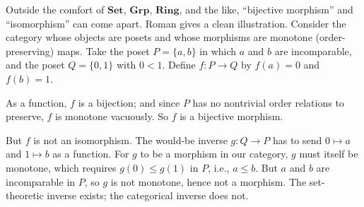 \begin{example}
Outside the comfort of $\mathbf{Set}$, $\mathbf{Grp}$, $\mathbf{Ring}$, and the
like, ``bijective morphism'' and ``isomorphism'' can come apart. Roman
\cite{roman2017introduction} gives a clean illustration. Consider the category
whose objects are posets and whose morphisms are monotone (order-preserving)
maps. Take the poset $P = \{a, b\}$ in which $a$ and $b$ are incomparable, and
the poset $Q = \{0, 1\}$ with $0 < 1$. Define $f : P \to Q$ by $f(a) = 0$ and
$f(b) = 1$.

\begin{center}
\end{center}

As a function, $f$ is a bijection; and since $P$ has no nontrivial order
relations to preserve, $f$ is monotone vacuously. So $f$ is a bijective
morphism.

But $f$ is not an isomorphism. The would-be inverse $g : Q \to P$ has to send
$0 \mapsto a$ and $1 \mapsto b$ as a function. For $g$ to be a morphism in our
category, $g$ must itself be monotone, which requires $g(0) \leq g(1)$ in $P$,
i.e., $a \leq b$. But $a$ and $b$ are incomparable in $P$, so $g$ is not
monotone, hence not a morphism. The set-theoretic inverse exists; the categorical
inverse does not.


\end{example}
